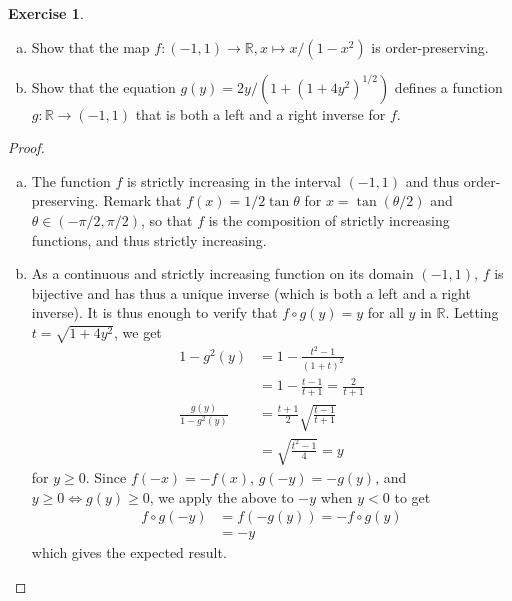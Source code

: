 \documentclass[11pt,a4paper,twoside]{article}
\theoremstyle{definition}
\newcounter{excounter}
\newtheorem{exercise}[excounter]{Exercise}
\begin{document}
\begin{exercise}

  \begin{enumerate}[(a)]

  \item Show that the map $f : ({-1}, 1) \to \mathbb{R}, x \mapsto x / (1 - x^2)$ is order-preserving.
  \item Show that the equation $g (y) = 2y \left. / \left( 1 + \left( 1 + 4y^2 \right)^{1 / 2} \right) \right.$ defines a function $g : \mathbb{R} \to ({-1}, 1)$
    that is both a left and a right inverse for $f$.

  \end{enumerate}

\end{exercise}

\begin{proof}\hfill

  \begin{enumerate}[(a)]

  \item The function $f$ is strictly increasing in the interval $({-1}, 1)$ and thus order-preserving.
    Remark that $f (x) = 1 / 2 \tan \theta$ for $x = \tan ( \theta / 2 )$ and $\theta \in ({-\pi} / 2, \pi / 2)$,
    so that $f$ is the composition of strictly increasing functions, and thus strictly increasing.

  \item As a continuous and strictly increasing function on its domain $({-1}, 1)$, $f$ is bijective and has thus a unique inverse
    (which is both a left and a right inverse). It is thus enough to verify that $f \circ g (y) = y$ for all $y$ in $\mathbb{R}$.
    Letting $t = \sqrt{1 + 4 y^2}$, we get
    \begin{align*}
      1 - g^2 (y) &= 1 - \frac{t^2 - 1}{(1 + t)^2} \\
      &= 1 - \frac{t - 1}{t + 1} = \frac{2}{t + 1} \\
      \frac{g (y)}{1 - g^2 (y)} &= \frac{t + 1}{2} \sqrt{\frac{t - 1}{t + 1}} \\
      &= \sqrt{\frac{t^2 - 1}{4}} = y
    \end{align*}
    for $y \geq 0$. Since $f (-x) = - f (x)$, $g (-y) = - g (y)$, and $y \geq 0 \iff g (y) \geq 0$,
    we apply the above to $-y$ when $y < 0$ to get
    \begin{align*}
      f \circ g (-y) &= f \left( - g (y) \right) = - f \circ g (y) \\
      &= - y
    \end{align*}
    which gives the expected result.

  \end{enumerate}

\end{proof}
\end{document}
